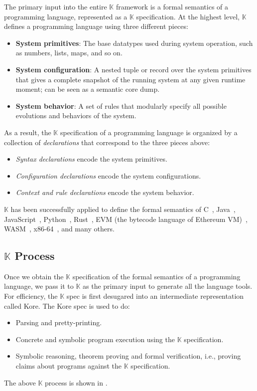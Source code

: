 \documentclass{article}
\newcommand{\K}{\ensuremath{\mathbb{K}}\xspace}
\begin{document}
The primary input into the entire \K framework is a formal semantics of a programming language,
represented as a \K specification.
At the highest level, \K defines a programming language using three different pieces:
\begin{itemize}
\item \textbf{System primitives}: The base datatypes used during system operation, such as numbers, lists, maps, and so on.
\item \textbf{System configuration}: A nested tuple or record over the system primitives that gives a complete snapshot of the running system at any given runtime moment; can be seen as a semantic core dump.
\item \textbf{System behavior}: A set of rules that modularly specify all possible evolutions and behaviors of the system.
\end{itemize}
As a result, the \K specification of a programming language
is organized by a collection of \emph{declarations}
that correspond to the three pieces above:
\begin{itemize}
\item \emph{Syntax declarations} encode the system primitives.
\item \emph{Configuration declarations} encode the system configurations.
\item \emph{Context and rule declarations} encode the system behavior.
\end{itemize}

\K has been successfully applied to define the formal semantics of 
C~\cite{c-semantics}, 
Java~\cite{java-semantics}, 
JavaScript~\cite{kjs}, 
Python~\cite{python-semantics}, 
Rust~\cite{krust-shanghai,krust-singapore},
EVM (the bytecode language of Ethereum VM)~\cite{kevm}, 
WASM~\cite{kwasm}, 
x86-64~\cite{DPK+19}, 
and many others.

\subsection{\K Process}
\label{sec:kprocess}

Once we obtain the \K specification of the formal semantics of a programming language,
we pass it to \K as the primary input to generate all the language tools.
For efficiency, the \K spec is first desugared into an intermediate representation called Kore.
The Kore spec is used to do:
\begin{itemize}
\item Parsing and pretty-printing.
\item Concrete and symbolic program execution using the \K specification.
\item Symbolic reasoning, theorem proving and formal verification, i.e., proving claims about programs against the \K specification.
\end{itemize}
The above \K process is shown in .
\end{document}
